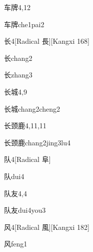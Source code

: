 \begin{entry}{车牌}{4,12}
  \begin{phonetics}{车牌}{che1pai2}
  \end{phonetics}
\end{entry}

\begin{entry}{长}{4}[Radical 長][Kangxi 168]
  \begin{phonetics}{长}{chang2}
  \end{phonetics}
  \begin{phonetics}{长}{zhang3}
  \end{phonetics}
\end{entry}

\begin{entry}{长城}{4,9}
  \begin{phonetics}{长城}{chang2cheng2}
  \end{phonetics}
\end{entry}

\begin{entry}{长颈鹿}{4,11,11}
  \begin{phonetics}{长颈鹿}{chang2jing3lu4}
  \end{phonetics}
\end{entry}

\begin{entry}{队}{4}[Radical 阜]
  \begin{phonetics}{队}{dui4}
  \end{phonetics}
\end{entry}

\begin{entry}{队友}{4,4}
  \begin{phonetics}{队友}{dui4you3}
  \end{phonetics}
\end{entry}

\begin{entry}{风}{4}[Radical 風][Kangxi 182]
  \begin{phonetics}{风}{feng1}
  \end{phonetics}
\end{entry}

